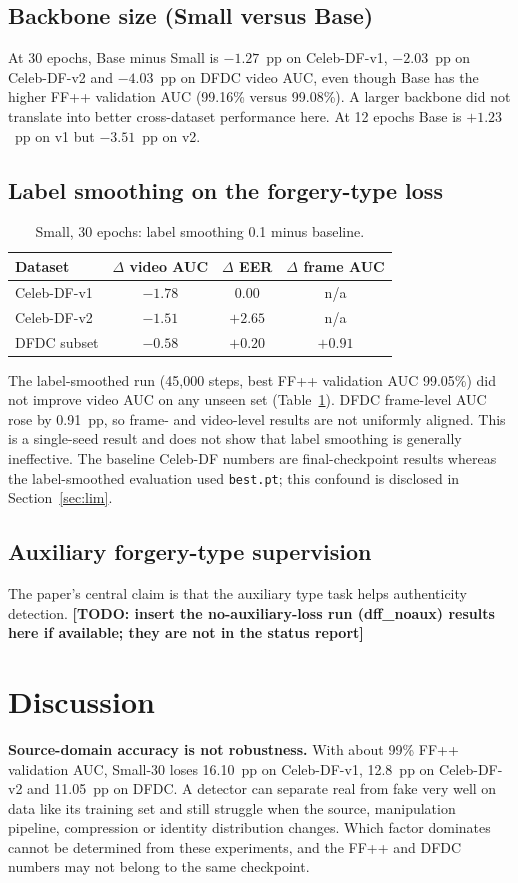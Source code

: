 \documentclass[lettersize,journal]{IEEEtran}
\newcommand{\todo}[1]{\textbf{[TODO: #1]}}
\begin{document}
\subsection{Backbone size (Small versus Base)}
At 30 epochs, Base minus Small is $-1.27$~pp on Celeb-DF-v1, $-2.03$~pp on Celeb-DF-v2 and $-4.03$~pp on DFDC video AUC, even though Base has the higher FF++ validation AUC (99.16\% versus 99.08\%). A larger backbone did not translate into better cross-dataset performance here. At 12 epochs Base is $+1.23$~pp on v1 but $-3.51$~pp on v2.

\subsection{Label smoothing on the forgery-type loss}
\begin{table}[!t]
\caption{Small, 30 epochs: label smoothing 0.1 minus baseline.\label{tab:ls}}
\centering
\footnotesize
\begin{tabular}{|l||c|c|c|}
\hline
Dataset & $\Delta$ video AUC & $\Delta$ EER & $\Delta$ frame AUC\\
\hline
Celeb-DF-v1 & $-1.78$ & $0.00$ & n/a\\
Celeb-DF-v2 & $-1.51$ & $+2.65$ & n/a\\
DFDC subset & $-0.58$ & $+0.20$ & $+0.91$\\
\hline
\end{tabular}
\end{table}
The label-smoothed run (45{,}000 steps, best FF++ validation AUC 99.05\%) did not improve video AUC on any unseen set (Table~\ref{tab:ls}). DFDC frame-level AUC rose by 0.91~pp, so frame- and video-level results are not uniformly aligned. This is a single-seed result and does not show that label smoothing is generally ineffective. The baseline Celeb-DF numbers are final-checkpoint results whereas the label-smoothed evaluation used \texttt{best.pt}; this confound is disclosed in Section~\ref{sec:lim}.

\subsection{Auxiliary forgery-type supervision}
The paper's central claim is that the auxiliary type task helps authenticity detection. \todo{insert the no-auxiliary-loss run (dff\_noaux) results here if available; they are not in the status report}

\section{Discussion}
\textbf{Source-domain accuracy is not robustness.} With about 99\% FF++ validation AUC, Small-30 loses 16.10~pp on Celeb-DF-v1, 12.8~pp on Celeb-DF-v2 and 11.05~pp on DFDC. A detector can separate real from fake very well on data like its training set and still struggle when the source, manipulation pipeline, compression or identity distribution changes. Which factor dominates cannot be determined from these experiments, and the FF++ and DFDC numbers may not belong to the same checkpoint.
\end{document}
